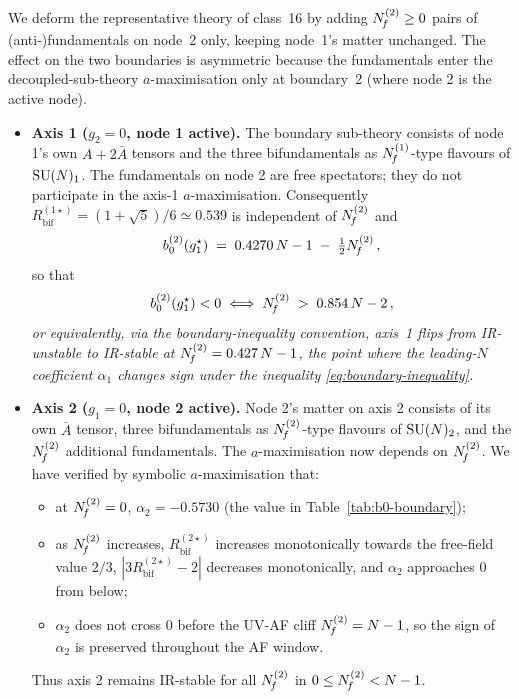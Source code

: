 We deform the representative theory of class~16 by adding
$N_{\!f}^{(2)}\ge 0$ pairs of (anti-)fundamentals on node~2 only, keeping
node~1's matter unchanged.  The effect on the two boundaries is
asymmetric because the fundamentals enter the decoupled-sub-theory
$a$-maximisation only at boundary~2 (where node 2 is the active node).

\begin{itemize}\setlength{\itemsep}{4pt}
  \item \textbf{Axis 1 ($g_{2}=0$, node 1 active).}  The boundary
    sub-theory consists of node 1's own $A+2\bar A$ tensors and the
    three bifundamentals as $N_{\!f}^{(1)}$-type flavours of $\mathrm{SU}(N)_{1}$.
    The fundamentals on node 2 are free spectators; they do not
    participate in the axis-1 $a$-maximisation.  Consequently
    $R_{\text{bif}}^{(1\star)}=(1+\sqrt 5)/6\simeq 0.539$ is
    independent of $N_{\!f}^{(2)}$ and
    \begin{equation}
      b_{0}^{(2)}(g_{1}^{\star})\;=\;0.4270\,N-1\;-\;\tfrac{1}{2}N_{\!f}^{(2)}\,,
      \label{eq:class16-b0-axis1}
    \end{equation}
    so that
    \begin{equation}
      b_{0}^{(2)}(g_{1}^{\star})<0
      \;\Longleftrightarrow\;
      N_{\!f}^{(2)}\;>\;0.854\,N-2\,,
    \end{equation}
    \emph{or equivalently, via the boundary-inequality convention,
    axis~1 flips from IR-unstable to IR-stable at
    $N_{\!f}^{(2)}=0.427\,N-1$, the point where the leading-$N$
    coefficient $\alpha_{1}$ changes sign under the inequality
    \eqref{eq:boundary-inequality}.}

  \item \textbf{Axis 2 ($g_{1}=0$, node 2 active).}  Node 2's matter
    on axis 2 consists of its own $\bar A$ tensor, three
    bifundamentals as $N_{\!f}^{(2)}$-type flavours of $\mathrm{SU}(N)_{2}$, and
    the $N_{\!f}^{(2)}$ additional fundamentals.  The $a$-maximisation
    now depends on $N_{\!f}^{(2)}$.  We have verified by symbolic
    $a$-maximisation that:
    \begin{itemize}
      \item at $N_{\!f}^{(2)}=0$, $\alpha_{2}=-0.5730$ (the value in
        Table~\ref{tab:b0-boundary});
      \item as $N_{\!f}^{(2)}$ increases, $R_{\text{bif}}^{(2\star)}$
        increases monotonically towards the free-field value $2/3$,
        $|3R_{\text{bif}}^{(2\star)}-2|$ decreases monotonically, and
        $\alpha_{2}$ approaches $0$ from below;
      \item $\alpha_{2}$ does not cross $0$ before the UV-AF cliff
        $N_{\!f}^{(2)}=N-1$, so the sign of $\alpha_{2}$ is preserved
        throughout the AF window.
    \end{itemize}
    Thus axis 2 remains IR-stable for all $N_{\!f}^{(2)}$ in
    $0\le N_{\!f}^{(2)}<N-1$.
\end{itemize}

